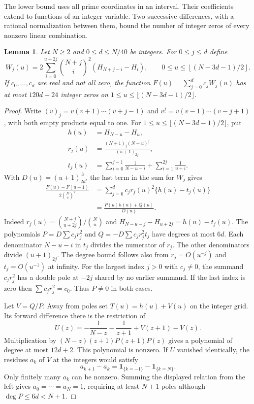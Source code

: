 \documentclass[11pt,a4paper,oneside,openany]{report}
\newtheorem{lemma}[theorem]{Lemma}\newtheorem{proposition}[theorem]{Proposition}
\theoremstyle{remark}\newtheorem{remark}[theorem]{Remark}
\numberwithin{equation}{section}
\begin{document}
The lower bound uses all prime coordinates in an interval.
Their coefficients extend to functions of an integer variable. Two
successive differences, with a rational normalization between them, bound
the number of integer zeros of every nonzero linear combination.

\begin{lemma}\label{ch1:so:zeros}
Let $N\geq 2$ and $0\le d\le N/40$ be integers. For $0\le j\le d$ define
\[
 W_j(u)=2\sum_{i=0}^{u+2j}\binom{N+j}{i}^{\!2}
        (H_{N+j-i}-H_i),\qquad
 0\le u\le \left\lfloor (N-3d-1)/2\right\rfloor .
\]
If $c_0,\ldots,c_d$ are real and not all zero, the function
$F(u)=\sum_{j=0}^d c_jW_j(u)$ has at most $120d+24$ integer zeros on
$1\le u\le\lfloor(N-3d-1)/2\rfloor$.
\end{lemma}

\begin{proof}
Write $(v)_j=v(v+1)\cdots(v+j-1)$ and
$v^{\underline j}=v(v-1)\cdots(v-j+1)$, with both empty products equal
to one. For $1\le u\le\lfloor(N-3d-1)/2\rfloor$, put
\begin{align*}
 h(u)&=H_{N-u}-H_u,\\
 r_j(u)&=\frac{(N+1)_j(N-u)^{\underline j}}{(u+1)_{2j}},\\
 t_j(u)&=\sum_{i=0}^{j-1}\frac1{N-u-i}
              +\sum_{i=1}^{2j}\frac1{u+i}.
\end{align*}
With $D(u)=(u+1)_{2d}^{\,3}$, the last term in the sum for $W_j$ gives
\begin{align*}
 \frac{F(u)-F(u-1)}{2\binom Nu^2}
 &=\sum_{j=0}^d c_jr_j(u)^2\{h(u)-t_j(u)\}\\
 &=\frac{P(u)h(u)+Q(u)}{D(u)} .
\end{align*}
Indeed $r_j(u)=\binom{N+j}{u+2j}/\binom Nu$ and
$H_{N-u-j}-H_{u+2j}=h(u)-t_j(u)$.
The polynomials $P=D\sum c_j r_j^2$ and
$Q=-D\sum c_jr_j^2t_j$ have degrees at most $6d$. Each denominator
$N-u-i$ in $t_j$ divides the numerator of $r_j$. The other
denominators divide $(u+1)_{2j}$. The degree bound follows also from
$r_j=O(u^{-j})$ and $t_j=O(u^{-1})$ at infinity.
For the largest index $j>0$ with $c_j\ne0$, the summand $c_jr_j^2$
has a double pole at $-2j$ shared by no earlier summand. If the last
index is zero then $\sum c_jr_j^2=c_0$. Thus $P\ne0$ in both cases.

Let $V=Q/P$. Away from poles set $T(u)=h(u)+V(u)$ on the integer
grid. Its forward difference there is the restriction of
\[
 U(z)=-\frac1{N-z}-\frac1{z+1}+V(z+1)-V(z).
\]
Multiplication by $(N-z)(z+1)P(z+1)P(z)$ gives a polynomial of degree
at most $12d+2$. This polynomial is nonzero. If $U$ vanished
identically, the residues $a_k$ of $V$ at the integers would satisfy
\[
 a_{k+1}-a_k=\mathbf 1_{\{k=-1\}}-\mathbf 1_{\{k=N\}} .
\]
Only finitely many $a_k$ can be nonzero. Summing the displayed
relation from the left gives $a_0=\cdots=a_N=1$, requiring at least
$N+1$ poles although $\deg P\le6d<N+1$.


\end{proof}
\end{document}
